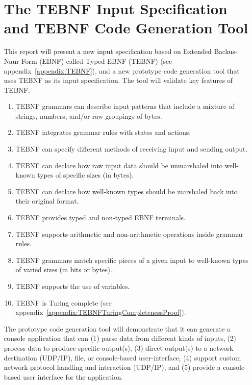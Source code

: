 \section{The TEBNF Input Specification and TEBNF Code Generation Tool}
This report will present a new input specification based on Extended Backus-Naur Form (EBNF) called Typed-EBNF (TEBNF) (see appendix~\ref{appendix:TEBNF}), and a new prototype code generation tool that uses TEBNF as its input specification.  The tool will validate key features of TEBNF:
\begin{enumerate}
  \item TEBNF grammars can describe input patterns that include a mixture of strings, numbers, and/or raw groupings of bytes.
  \item TEBNF integrates grammar rules with states and actions.
  \item TEBNF can specify different methods of receiving input and sending output.
  \item TEBNF can declare how raw input data should be unmarshaled into well-known types of specific sizes (in bytes).
  \item TEBNF can declare how well-known types should be marshaled back into their original format.
  \item TEBNF provides typed and non-typed EBNF terminals.
  \item TEBNF supports arithmetic and non-arithmetic operations inside grammar rules.
  \item TEBNF grammars match specific pieces of a given input to well-known types of varied sizes (in bits or bytes).
  \item TEBNF supports the use of variables.
  \item TEBNF is Turing complete (see appendix~\ref{appendix:TEBNFTuringCompletenessProof}).
\end{enumerate}

\indent
The prototype code generation tool will demonstrate that it can generate a console application that can (1) parse data from different kinds of inputs, (2) process data to produce specific output(s), (3) direct output(s) to a network destination (UDP/IP), file, or console-based user-interface, (4) support custom network protocol handling and interaction (UDP/IP), and (5) provide a console-based user interface for the application.

